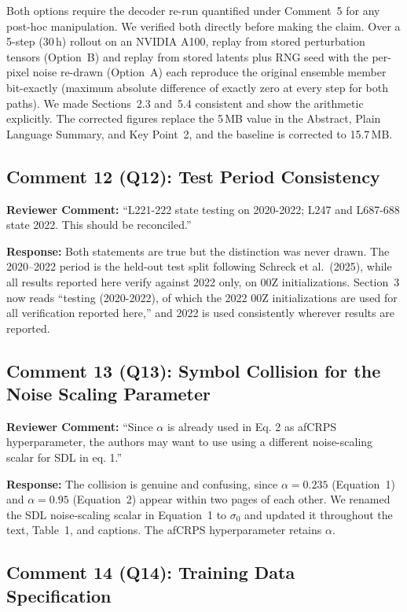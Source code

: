 \documentclass[12pt]{article}
\begin{document}
Both options require the decoder re-run quantified under Comment~5 for any post-hoc
manipulation. We verified both directly before making the claim. Over a 5-step
(30\,h) rollout on an NVIDIA A100, replay from stored perturbation tensors (Option~B)
and replay from stored latents plus RNG seed with the per-pixel noise re-drawn
(Option~A) each reproduce the original ensemble member bit-exactly (maximum
absolute difference of exactly zero at every step for both paths). We made
Sections~2.3 and~5.4 consistent and show the arithmetic explicitly. The corrected
figures replace the 5\,MB value in the Abstract, Plain Language Summary, and Key
Point~2, and the baseline is corrected to 15.7\,MB.

\subsection*{Comment 12 (Q12): Test Period Consistency}

\textbf{Reviewer Comment:} ``L221-222 state testing on 2020-2022; L247 and L687-688
state 2022. This should be reconciled.''

\textbf{Response:} Both statements are true but the distinction was never drawn.
The 2020--2022 period is the held-out test split following Schreck et al.\ (2025), while all
results reported here verify against 2022 only, on 00Z initializations. Section~3 now
reads ``testing (2020-2022), of which the 2022 00Z initializations are used for all
verification reported here,'' and 2022 is used consistently wherever results are
reported.

\subsection*{Comment 13 (Q13): Symbol Collision for the Noise Scaling Parameter}

\textbf{Reviewer Comment:} ``Since $\alpha$ is already used in Eq. 2 as afCRPS
hyperparameter, the authors may want to use using a different noise-scaling scalar for
SDL in eq. 1.''

\textbf{Response:} The collision is genuine and confusing, since
$\alpha=0.235$ (Equation~1) and $\alpha=0.95$ (Equation~2) appear within two pages of
each other. We renamed the SDL noise-scaling scalar in Equation~1 to $\sigma_0$
and updated it throughout the text, Table~1, and captions. The afCRPS hyperparameter
retains $\alpha$.

\subsection*{Comment 14 (Q14): Training Data Specification}
\end{document}

